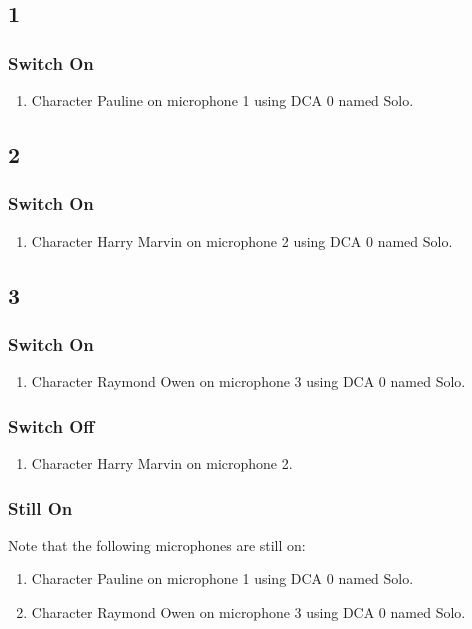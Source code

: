 \subsection* {1}
\subsubsection* {Switch On}
\begin{enumerate}
\item Character Pauline on microphone 1 using DCA 0 named Solo.
\end{enumerate}
\subsection* {2}
\subsubsection* {Switch On}
\begin{enumerate}
\item Character Harry Marvin on microphone 2 using DCA 0 named Solo.
\end{enumerate}
\subsection* {3}
\subsubsection* {Switch On}
\begin{enumerate}
\item Character Raymond Owen on microphone 3 using DCA 0 named Solo.
\end{enumerate}
\subsubsection* {Switch Off}
\begin{enumerate}
\item Character Harry Marvin on microphone 2.
\end{enumerate}
\subsubsection* {Still On}
Note that the following microphones are still on:
\begin{enumerate}
\item Character Pauline on microphone 1 using DCA 0 named Solo.
\item Character Raymond Owen on microphone 3 using DCA 0 named Solo.
\end{enumerate}
